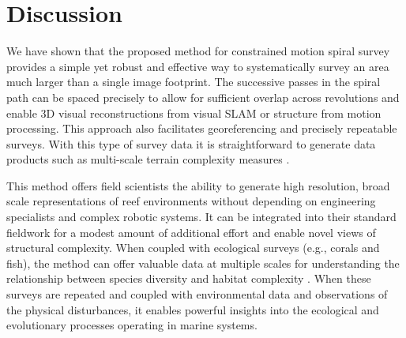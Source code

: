 \section{Discussion}
We have shown that the proposed method for constrained motion spiral survey provides a simple yet robust and effective way to systematically survey an area much larger than a single image footprint. The successive passes in the spiral path can be spaced precisely to allow for sufficient overlap across revolutions and enable 3D visual reconstructions from visual SLAM or structure from motion processing. This approach also facilitates georeferencing and precisely repeatable surveys. With this type of survey data it is straightforward to generate data products such as multi-scale terrain complexity measures \cite{Friedman_2012}.

This method offers field scientists the ability to generate high resolution, broad scale representations of reef environments without depending on engineering specialists and complex robotic systems. It can be integrated into their standard fieldwork for a modest amount of additional effort and enable novel views of structural complexity. When coupled with ecological surveys (e.g., corals and fish), the method can offer valuable data at multiple scales for understanding the relationship between species diversity and habitat complexity  \cite{Graham_2012}. When these surveys are repeated and coupled with environmental data and observations of the physical disturbances, it enables powerful insights into the ecological and evolutionary processes operating in marine systems.

